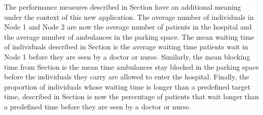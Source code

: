 

The performance measures described in Section
have an additional meaning under the context of this new application.
The average number of individuals in Node 1 and Node 2 are now the average
number of patients in the hospital and the average number of ambulances in the
parking space.
The mean waiting time of individuals described in Section
is the average waiting time patients wait in Node 1 before they are seen by a
doctor or nurse.
Similarly, the mean blocking time from Section
is the mean time ambulances stay blocked in the parking space before the
individuals they carry are allowed to enter the hospital.
Finally, the proportion of individuals whose waiting time is longer than a
predefined target time, described in Section
is now the percentage of patients that wait longer than a predefined time
before they are seen by a doctor or nurse.


